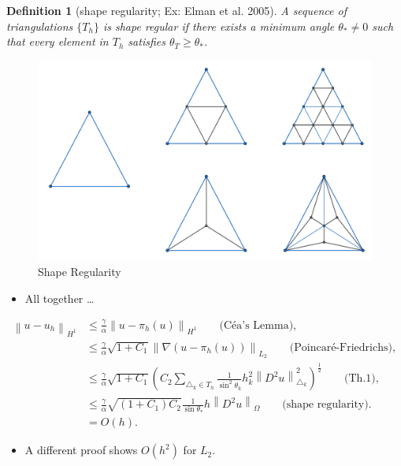 \documentclass{beamer}
\newcommand{\norm}[2]{\left \lVert #1 \right \rVert_{#2}}
\newtheorem{defn}{Definition}
\begin{document}
  \begin{frame}
	\begin{defn}[shape regularity; Ex: Elman et al. 2005]
		A sequence of triangulations $\{T_h\}$ is shape regular if there exists a minimum angle $\theta_* \neq 0$ such that every element in $T_h$ satisfies $\theta_T \geq \theta_*$.
	  \end{defn}
	  	\begin{figure}
	  \centering
	  \includegraphics[width=.80\textwidth]{Figures/ShapeRegularity.png}
	  \caption*{Shape Regularity}
	\end{figure}
\end{frame}




  \begin{frame}
	\begin{itemize}
		\item All together \dots
	\end{itemize}
	\begin{align*}
		\norm{u - u_h}{H^1} &\leq \frac{\gamma}{\alpha}\norm{u - \pi_h(u)}{H^1} \qquad \text{(Céa's Lemma)},\\
		&\leq \frac{\gamma}{\alpha} \sqrt{1 + C_1} \norm{\nabla(u - \pi_h(u))}{L_2} \qquad \text{(Poincaré-Friedrichs)},\\
		&\leq \frac{\gamma}{\alpha} \sqrt{1 + C_1} \left(C_2\sum_{{\triangle_k}\in {T_h}} \frac{1}{\sin^2 \theta_k} h_k^2 \norm{D^2u}{\triangle_k}^2\right)^{\frac{1}{2}}
		\qquad \text{(Th.1)},\\
		&\leq  \frac{\gamma}{\alpha} \sqrt{(1 + C_1)C_2}  \frac{1}{\sin \theta_*} h\norm{D^2u}{\Omega} \qquad \text{(shape regularity)}.\\
		&= O(h).
	  \end{align*}
	  \begin{itemize}
		\item A different proof shows $O(h^2)$ for $L_2$.
	  \end{itemize}
  \end{frame}
\end{document}
